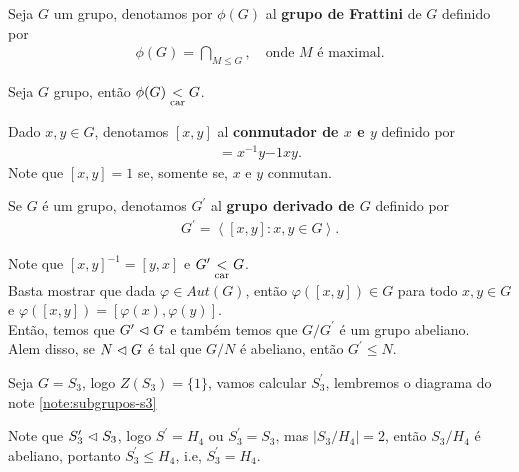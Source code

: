\begin{definition}
  Seja $G$ um grupo, denotamos por $\phi(G)$ al \textbf{grupo de Frattini} de $G$ definido por
  \begin{align*}
    \phi(G)=\bigcap_{M\leq G},\quad\text{onde $M$ é maximal.}
  \end{align*}
\end{definition}
\begin{example}
  Seja $G$ grupo, então $\phi(G)\underset{\text{car}}{<} G$. 
\end{example}
\begin{definition}[Conmutado]
  Dado $x,y\in G$, denotamos $[x,y]$ al \textbf{conmutador de $x$ e $y$} definido por 
  \begin{align*}
    [x,y]=x^{-1}y{-1}xy.
  \end{align*}
  Note que $[x,y]=1$ se, somente se, $x$ e $y$ conmutan. 
\end{definition}
\begin{definition}
  Se $G$ é um grupo, denotamos $G^{\prime}$ al \textbf{grupo derivado de $G$} definido por
  \begin{align*}
    G^{\prime}=\left\langle [x,y]:x,y\in G \right\rangle.
  \end{align*}
\end{definition}
\begin{example}
  Note que $[x,y]^{-1}=[y,x]$ e $G^{\prime}\underset{\text{car}}{<} G$.\\
  Basta mostrar que dada $\varphi\in Aut(G)$, então $\varphi([x,y])\in G$ para todo $x,y\in G$ e $\varphi([x,y])=[\varphi(x),\varphi(y)]$.\\
  Então, temos que $G^{\prime}\vartriangleleft G$ e também temos que $G/G^{\prime}$ é um grupo abeliano.\\
  Alem disso, se $N\vartriangleleft G$ é tal que $G/N$ é abeliano, então $G^{\prime}\leq N$. 
\end{example}
\begin{example}
  Seja $G=S_3$, logo $Z(S_3)=\{1\}$, vamos calcular $S_3^{\prime}$, lembremos o diagrama do note \ref{note:subgrupos-s3} 
  \begin{center}
      
  \end{center}
  Note que $S_3^{\prime}\vartriangleleft S_3$, logo $S^{\prime}=H_4$ ou $S_3^{\prime}=S_3$, mas $|S_3/H_4|=2$, então $S_3/H_4$ é abeliano, portanto $S_3^{\prime}\leq H_4$, i.e, $S_3^{\prime}=H_4$. 
\end{example}
